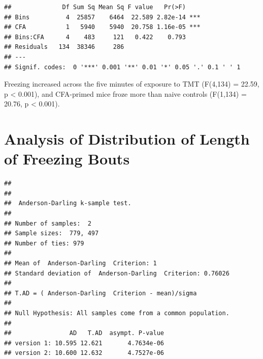 \documentclass[
]{book}
\newenvironment{Shaded}{\begin{snugshade}}{\end{snugshade}}
\newcommand{\FunctionTok}[1]{\textcolor[rgb]{0.13,0.29,0.53}{\textbf{#1}}}
\newcommand{\NormalTok}[1]{#1}
\newcommand{\OtherTok}[1]{\textcolor[rgb]{0.56,0.35,0.01}{#1}}
\newcommand{\SpecialCharTok}[1]{\textcolor[rgb]{0.81,0.36,0.00}{\textbf{#1}}}
\newcommand{\StringTok}[1]{\textcolor[rgb]{0.31,0.60,0.02}{#1}}
\begin{document}
\begin{verbatim}
##              Df Sum Sq Mean Sq F value   Pr(>F)    
## Bins          4  25857    6464  22.589 2.82e-14 ***
## CFA           1   5940    5940  20.758 1.16e-05 ***
## Bins:CFA      4    483     121   0.422    0.793    
## Residuals   134  38346     286                     
## ---
## Signif. codes:  0 '***' 0.001 '**' 0.01 '*' 0.05 '.' 0.1 ' ' 1
\end{verbatim}

Freezing increased across the five minutes of exposure to TMT (F(4,134) = 22.59, p \textless{} 0.001), and CFA-primed mice froze more than naive controls (F(1,134) = 20.76, p \textless{} 0.001).

\section*{Analysis of Distribution of Length of Freezing Bouts}\label{analysis-of-distribution-of-length-of-freezing-bouts}

\begin{Shaded}
\end{Shaded}

\begin{verbatim}
## 
## 
##  Anderson-Darling k-sample test.
## 
## Number of samples:  2
## Sample sizes:  779, 497
## Number of ties: 979
## 
## Mean of  Anderson-Darling  Criterion: 1
## Standard deviation of  Anderson-Darling  Criterion: 0.76026
## 
## T.AD = ( Anderson-Darling  Criterion - mean)/sigma
## 
## Null Hypothesis: All samples come from a common population.
## 
##                AD   T.AD  asympt. P-value
## version 1: 10.595 12.621       4.7634e-06
## version 2: 10.600 12.632       4.7527e-06
\end{verbatim}
\end{document}
